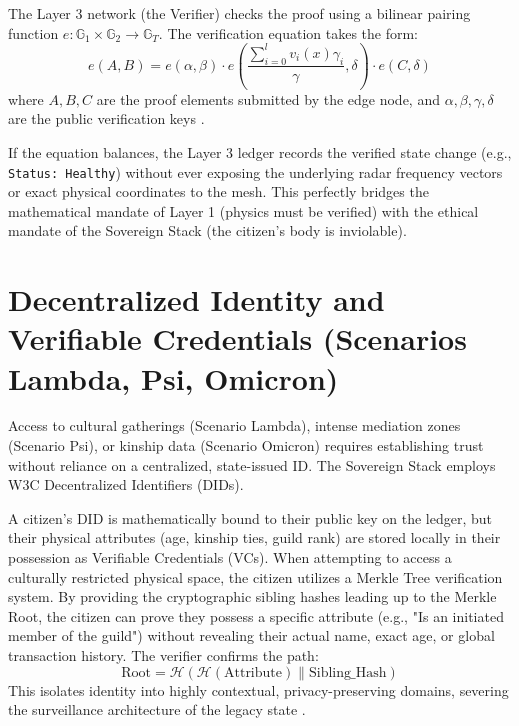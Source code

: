 The Layer 3 network (the Verifier) checks the proof using a bilinear pairing function $e: \mathbb{G}_1 \times \mathbb{G}_2 \rightarrow \mathbb{G}_T$. The verification equation takes the form:
\begin{equation}
e(A, B) = e(\alpha, \beta) \cdot e\left( \frac{\sum_{i=0}^l v_i(x) \gamma_i}{\gamma}, \delta \right) \cdot e(C, \delta)
\end{equation}
where $A, B, C$ are the proof elements submitted by the edge node, and $\alpha, \beta, \gamma, \delta$ are the public verification keys \cite{groth2016size}. 

If the equation balances, the Layer 3 ledger records the verified state change (e.g., \texttt{Status: Healthy}) without ever exposing the underlying radar frequency vectors or exact physical coordinates to the mesh. This perfectly bridges the mathematical mandate of Layer 1 (physics must be verified) with the ethical mandate of the Sovereign Stack (the citizen's body is inviolable).

\section{Decentralized Identity and Verifiable Credentials (Scenarios Lambda, Psi, Omicron)}
Access to cultural gatherings (Scenario Lambda), intense mediation zones (Scenario Psi), or kinship data (Scenario Omicron) requires establishing trust without reliance on a centralized, state-issued ID. The Sovereign Stack employs W3C Decentralized Identifiers (DIDs).

A citizen's DID is mathematically bound to their public key on the ledger, but their physical attributes (age, kinship ties, guild rank) are stored locally in their possession as Verifiable Credentials (VCs). When attempting to access a culturally restricted physical space, the citizen utilizes a Merkle Tree verification system. By providing the cryptographic sibling hashes leading up to the Merkle Root, the citizen can prove they possess a specific attribute (e.g., "Is an initiated member of the guild") without revealing their actual name, exact age, or global transaction history. The verifier confirms the path:
\begin{equation}
\text{Root} = \mathcal{H}(\mathcal{H}(\text{Attribute}) \parallel \text{Sibling\_Hash})
\end{equation}
This isolates identity into highly contextual, privacy-preserving domains, severing the surveillance architecture of the legacy state \cite{sporny2021w3c}.

